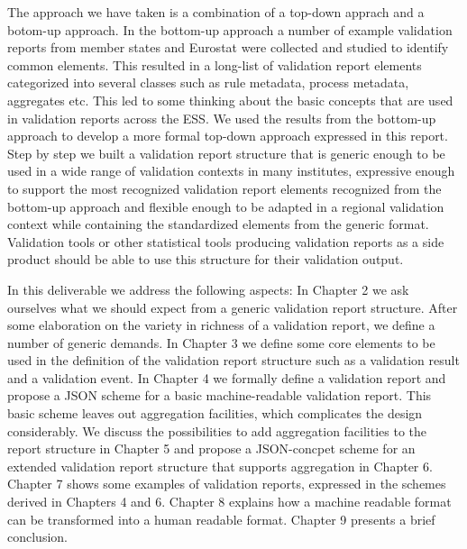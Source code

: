 The approach we have taken is a combination of a top-down apprach and a botom-up approach.
In the bottom-up approach a number of example validation reports from member states and Eurostat were collected and studied to identify common elements.
This resulted in a long-list of validation report elements categorized into several classes such as rule metadata, process metadata, aggregates etc.
This led to some thinking about the basic concepts that are used in validation reports across the ESS.
We used the results from the bottom-up approach to develop a more formal top-down approach expressed in this report.
Step by step we built a validation report structure that is generic enough to be used in a wide range of validation contexts in many institutes,
expressive enough to support the most recognized validation report elements recognized from the bottom-up approach and
flexible enough to be adapted in a regional validation context while containing the standardized elements from the generic format.
Validation tools or other statistical tools producing validation reports as a side product should be able to use this structure for their validation output.

In this deliverable we address the following aspects:
In Chapter 2 we ask ourselves what we should expect from a generic validation report structure.
After some elaboration on the variety in richness of a validation report, we define a number of generic demands.
In Chapter 3 we define some core elements to be used in the definition of the validation report structure such as a validation result and a validation event.
In Chapter 4 we formally define a validation report and propose a JSON scheme for a basic machine-readable validation report.
This basic scheme leaves out aggregation facilities, which complicates the design considerably.
We discuss the possibilities to add aggregation facilities to the report structure in Chapter 5 and propose a JSON-concpet scheme for an extended validation report structure that supports aggregation in Chapter 6.
Chapter 7 shows some examples of validation reports, expressed in the schemes derived in Chapters 4 and 6.
Chapter 8 explains how a machine readable format can be transformed into a human readable format.
Chapter 9 presents a brief conclusion.

